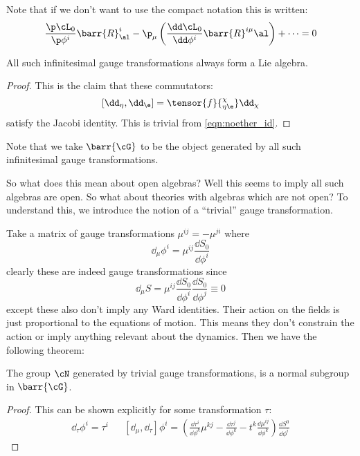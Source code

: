 \documentclass{booc}
\begin{document}
Note that if we don't want to use the compact notation this is written:
\begin{equation}
\frac{\p \cL_0}{\p \phi^i} \barr{R}_\al^i - 
\p_\mu\left( \frac{\dd \cL_0}{\dd \phi^i} \barr{R}^{i\mu}{\al} \right) + \cdots = 0
\end{equation}

\begin{thm}
All such infinitesimal gauge transformations always form a Lie algebra.
\end{thm}

\begin{proof}
This is the claim that these commutators:
\begin{equation}
\left[ \dd_\eta , \dd_\e \right] = \tensor{f}{_{\eta \e}^\chi} \dd_\chi
\end{equation}
satisfy the Jacobi identity. 
This is trivial from \eqref{eqn:noether_id}.
\end{proof}

Note that we take $\barr{\cG}$ to be the object generated by all such infinitesimal
gauge transformations.

So what does this mean about open algebras?
Well this seems to imply all such algebras are open. 
So what about theories with algebras which are not open?
To understand this, we introduce the notion of a ``trivial'' gauge transformation.

Take a matrix of gauge transformations
$\mu^{ij} =-\mu^{ji}$
where
\begin{equation}
\dd_\mu \phi^i = \mu^{ij} \frac{\dd S_0}{\dd \phi^i}
\end{equation}
clearly these are indeed gauge transformations since
\begin{equation}
\dd_\mu S = 
\mu^{ij} \frac{\dd S_0}{  \dd\phi^i  }
\frac{\dd S_0}{   \dd \phi^j  }
\equiv 0 
\end{equation}
except these also don't imply any Ward identities.
Their action on the fields is just proportional to the equations of motion.
This means they don't constrain the action or imply anything relevant about the dynamics.
Then we have the following theorem:

\begin{thm}
The group $\cN$ generated by trivial gauge transformations, 
is a normal subgroup in $\barr{\cG}$.
\end{thm}

\begin{proof}
This can be shown explicitly for some transformation $\tau$:
\begin{align}
\dd_\tau \phi^i = \tau^i
&&
\left[ \dd_\mu , \dd_\tau \right]\phi^i = 
\left( \frac{\dd \tau^i}{\dd \phi^k} \mu^{kj} - 
\frac{\dd \tau^j}{\dd \phi^k} - t^k \frac{\dd \mu^{ij}}{\dd \phi^k}\right)
\frac{\dd S^0}{\dd \phi^i}
\end{align}
\end{proof}
\end{document}
